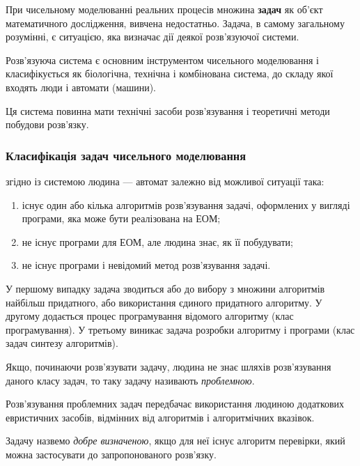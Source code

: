 При чисельному моделюванні реальних процесів множина \textbf{задач} як об'єкт математичного дослідження, вивчена недостатньо. Задача, в самому загальному розумінні, є ситуацією, яка визначає дії деякої розв'язуючої системи. 

\begin{definition}
    Розв'язуюча система є основним інструментом чисельного моделювання і класифікується як біологічна, технічна і комбінована система, до складу якої входять люди і автомати (машини). \medskip
    
    Ця система повинна мати технічні засоби розв'язування і теоретичні методи побудови розв'язку.
\end{definition}

\subsubsection{Класифікація задач чисельного моделювання} згідно із системою \guillemotleft{}людина --- автомат\guillemotright{} залежно від можливої ситуації така: 
\begin{enumerate}
    \item існує один або кілька алгоритмів розв'язування задачі, оформлених у вигляді програми, яка може бути реалізована на ЕОМ; 
    \item не існує програми для ЕОМ, але людина знає, як її побудувати; 
    \item не існує програми і невідомий метод розв'язування задачі. 
\end{enumerate}

У першому випадку задача зводиться або до вибору з множини алгоритмів найбільш придатного, або використання єдиного придатного алгоритму. У другому додається процес програмування відомого алгоритму (клас програмування). У третьому виникає задача розробки алгоритму і програми (клас задач синтезу алгоритмів).

\begin{definition}
    Якщо, починаючи розв'язувати задачу, людина не знає шляхів розв'язування даного класу задач, то таку задачу називають \textit{проблемною}.
\end{definition}

Розв'язування проблемних задач передбачає використання людиною додаткових евристичних засобів, відмінних від алгоритмів і алгоритмічних вказівок.

\begin{definition}
    Задачу назвемо \textit{добре визначеною}, якщо для неї існує алгоритм перевірки, який можна застосувати до запропонованого розв'язку.
\end{definition}

